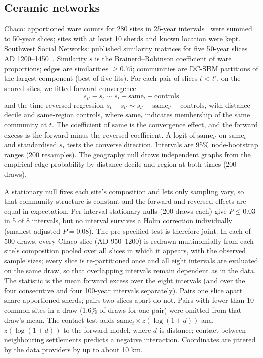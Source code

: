 \documentclass[11pt]{article}
\begin{document}
\subsection{Ceramic networks}
Chaco: apportioned ware counts for 280 sites in 25-year intervals~\cite{Mills2018,Daems2023,ChacoData} were summed
to 50-year slices; sites with at least 10 sherds and known location were kept. Southwest Social
Networks: published similarity matrices for five 50-year slices AD 1200--1450~\cite{Mills2013,SWSNData}.
Similarity $s$ is the Brainerd--Robinson coefficient of ware proportions; edges are similarities
$\ge0.75$; communities are DC-SBM partitions of the largest component (best of five fits). For each pair
of slices $t<t'$, on the shared sites, we fitted forward convergence
\begin{equation}
s_{t'}-s_t\sim s_t+\mathrm{same}_t+\text{controls}
\end{equation}
and the time-reversed regression $s_t-s_{t'}\sim s_{t'}+\mathrm{same}_{t'}+\text{controls}$, with
distance-decile and same-region controls, where $\mathrm{same}_t$ indicates membership of the same
community at $t$. The coefficient of $\mathrm{same}$ is the convergence effect, and the forward excess
is the forward minus the reversed coefficient. A logit of $\mathrm{same}_{t'}$ on $\mathrm{same}_t$ and
standardised $s_t$ tests the converse direction. Intervals are 95\% node-bootstrap ranges (200
resamples). The geography null draws independent graphs from the empirical edge probability by distance
decile and region at both times (200 draws).

A stationary null fixes each site's composition and lets only sampling vary, so that community
structure is constant and the forward and reversed effects are equal in expectation. Per-interval
stationary nulls (200 draws each) give $P\le0.03$ in 5 of 8 intervals, but no interval survives a Holm
correction individually (smallest adjusted $P=0.08$). The pre-specified test is therefore joint. In each
of 500 draws, every Chaco slice (AD 950--1200) is redrawn multinomially from each site's composition
pooled over all slices in which it appears, with the observed sample sizes; every slice is re-partitioned
once and all eight intervals are evaluated on the same draw, so that overlapping intervals remain
dependent as in the data. The statistic is the mean forward excess over the eight intervals (and over the
four consecutive and four 100-year intervals separately). Pairs one slice apart share apportioned sherds;
pairs two slices apart do not. Pairs with fewer than 10 common sites in a draw (1.6\% of draws for one
pair) were omitted from that draw's mean. The contact test adds $\mathrm{same}_t\times z(\log(1+d))$ and
$z(\log(1+d))$ to the forward model, where $d$ is distance; contact between neighbouring settlements
predicts a negative interaction. Coordinates are jittered by the data providers by up to about 10 km.
\end{document}
